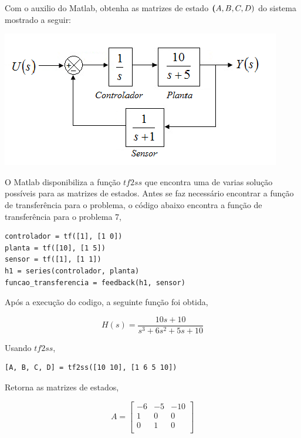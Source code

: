\documentclass[a4paper, 10pt]{article}
\begin{document}
\begin{list}{\textbf{Questão .}}{
\setlength{\labelwidth}{-2mm} \setlength{\parsep}{0mm}
\setlength{\topsep}{0mm} \setlength{\leftmargin}{0mm}}
\newpage
\item
    Com o auxilio do Matlab, obtenha as matrizes de estado $\textbf(A, B, C, D)$ do 
    sistema mostrado a seguir:
            \begin{center}
            \includegraphics[scale=0.6]{fig7.png}
            \end{center}

            O Matlab disponibiliza a função $tf2ss$ que encontra uma de varias 
            solução possíveis para as matrizes de estados. Antes se faz
            necessário encontrar a função de transferência para o problema, 
            o código abaixo encontra a função de transferência para o problema 7,

            \begin{lstlisting}
controlador = tf([1], [1 0])
planta = tf([10], [1 5])
sensor = tf([1], [1 1])
h1 = series(controlador, planta)
funcao_transferencia = feedback(h1, sensor)
                \end{lstlisting}

            Após a execução do codigo, a seguinte função foi obtida,

            $$
            H(s) = \frac{10 s + 10}{s^3 + 6 s^2 + 5 s + 10}
            $$

            Usando $tf2ss$, 

            \begin{lstlisting}
[A, B, C, D] = tf2ss([10 10], [1 6 5 10])
            \end{lstlisting}

            Retorna as matrizes de estados,

            $$
            A = \left[\begin{array}{rrr}
                    -6 & -5 & -10 \\
                    1 & 0 & 0 \\
                    0 & 1 & 0 \\
            \end{array}\right]
            $$


\end{list}
\end{document}
